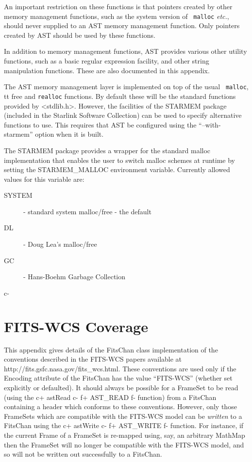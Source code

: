 \documentclass[twoside,11pt]{article}
\newcommand{\htmladdnormallink}[2]{#1}
\newcommand{\xlabel}[1]{}
\begin{document}
An important restriction on these functions is that pointers created by
other memory management functions, such as the system version of {\tt
malloc} \emph{etc.}, should never supplied to an AST memory management
function. Only pointers created by AST should be used by these functions.

In addition to memory management functions, AST provides various other
utility functions, such as a basic regular expression facility, and other
string manipulation functions. These are also documented in this appendix.

The AST memory management layer is implemented on top of the usual {\tt
malloc}, {tt free} and {\tt realloc} functions. By default these will be
the standard functions provided by <stdlib.h>. However, the facilities of
the STARMEM package (included in the Starlink Software Collection) can be
used to specify alternative functions to use. This requires that AST be
configured using the ``--with-starmem'' option when it is built.

The STARMEM package provides a wrapper for the standard malloc
implementation that enables the user to switch malloc schemes at runtime
by setting the STARMEM\_MALLOC environment variable. Currently allowed
values for this variable are:

\begin{description}
\item [SYSTEM] - standard system malloc/free - the default
\item [DL] - Doug Lea's malloc/free
\item [GC] - Hans-Boehm Garbage Collection
\end{description}

\small

\normalsize
c-

\newpage
\section{\xlabel{FitsWcsCoverage}\label{ss:fitswcscoverage}FITS-WCS Coverage}

This appendix gives details of the FitsChan class
implementation of the conventions described in the FITS-WCS papers
available at
\htmladdnormallink{http://fits.gsfc.nasa.gov/fits\_wcs.html}
{http://fits.gsfc.nasa.gov/fits_wcs.html}. These conventions are
used only if the Encoding attribute of the FitsChan
has the value ``FITS-WCS'' (whether set explicitly or defaulted). It
should always be possible for a FrameSet to be read
(using the
c+
astRead
c-
f+
AST\_READ
f-
function) from a FitsChan containing a header which conforms to these
conventions. However, only those FrameSets which are compatible with the
FITS-WCS model can be \emph{written} to a FitsChan using the
c+
astWrite
c-
f+
AST\_WRITE
f-
function. For instance, if the current Frame of a
FrameSet is re-mapped using, say, an arbitrary MathMap
then the FrameSet will no longer be compatible with the FITS-WCS model,
and so will not be written out successfully to a FitsChan.
\end{document}
